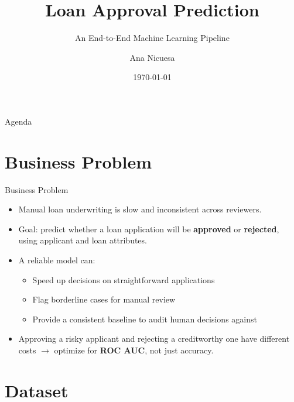 \documentclass[aspectratio=169]{beamer}
\title{Loan Approval Prediction}
\subtitle{An End-to-End Machine Learning Pipeline}
\author{Ana Nicuesa}
\date{\today}
\begin{document}
\begin{frame}
    \titlepage
\end{frame}

\begin{frame}{Agenda}
    \tableofcontents
\end{frame}

\section{Business Problem}

\begin{frame}{Business Problem}
    \begin{itemize}
        \item Manual loan underwriting is slow and inconsistent across reviewers.
        \item Goal: predict whether a loan application will be \textbf{approved} or \textbf{rejected}, using applicant and loan attributes.
        \item A reliable model can:
        \begin{itemize}
            \item Speed up decisions on straightforward applications
            \item Flag borderline cases for manual review
            \item Provide a consistent baseline to audit human decisions against
        \end{itemize}
        \item Approving a risky applicant and rejecting a creditworthy one have different costs $\rightarrow$ optimize for \textbf{ROC AUC}, not just accuracy.
    \end{itemize}
\end{frame}

\section{Dataset}
\end{document}
